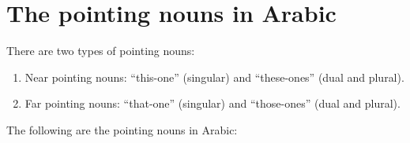 \documentclass[
  10pt,
]{book}
\providecommand{\tightlist}{%
  \setlength{\itemsep}{0pt}\setlength{\parskip}{0pt}}
\begin{document}
\section{The pointing nouns in Arabic}\label{the-pointing-nouns-in-arabic}

There are two types of pointing nouns:

\begin{enumerate}
\def\labelenumi{\roman{enumi}.}
\tightlist
\item
  Near pointing nouns: \enquote{this-one} (singular) and \enquote{these-ones} (dual and plural).
\item
  Far pointing nouns: \enquote{that-one} (singular) and \enquote{those-ones} (dual and plural).
\end{enumerate}

The following are the pointing nouns in Arabic:
\end{document}
